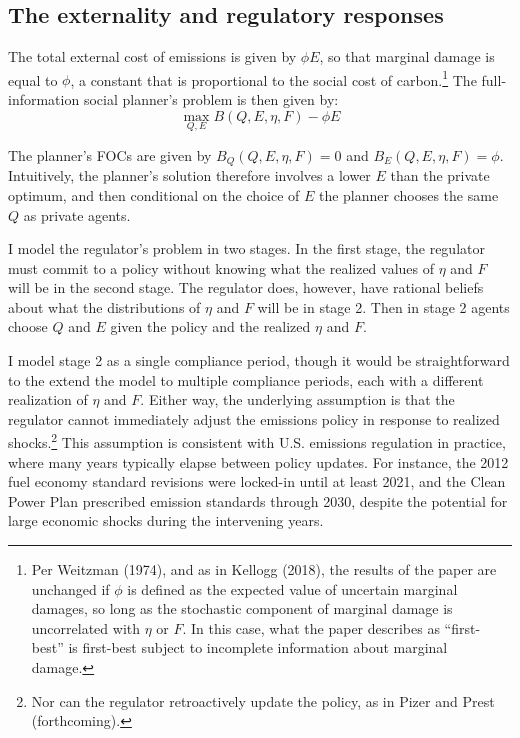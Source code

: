 \documentclass[12pt]{article}
\begin{document}
\subsection{The externality and regulatory responses} \label{sec:externality}

The total external cost of emissions is given by $\phi E$, so that marginal damage is equal to $\phi$, a constant that is proportional to the social cost of carbon.\footnote{Per Weitzman (1974), and as in Kellogg (2018), the results of the paper are unchanged if $\phi$ is defined as the expected value of uncertain marginal damages, so long as the stochastic component of marginal damage is uncorrelated with $\eta$ or $F$. In this case, what the paper describes as ``first-best'' is first-best subject to incomplete information about marginal damage.} The full-information social planner's problem is then given by:
\begin{equation}
\max_{Q,E}B(Q,E,\eta,F)-\phi E \label{eq:SP}
\end{equation}

The planner's FOCs are given by $B_Q(Q,E,\eta,F)=0$ and $B_E(Q,E,\eta,F)=\phi$. Intuitively, the planner's solution therefore involves a lower $E$ than the private optimum, and then conditional on the choice of $E$ the planner chooses the same $Q$ as private agents.

I model the regulator's problem in two stages. In the first stage, the regulator must commit to a policy without knowing what the realized values of $\eta$ and $F$ will be in the second stage. The regulator does, however, have rational beliefs about what the distributions of $\eta$ and $F$ will be in stage 2. Then in stage 2 agents choose $Q$ and $E$ given the policy and the realized $\eta$ and $F$. 

I model stage 2 as a single compliance period, though it would be straightforward to the extend the model to multiple compliance periods, each with a different realization of $\eta$ and $F$. Either way, the underlying assumption is that the regulator cannot immediately adjust the emissions policy in response to realized shocks.\footnote{Nor can the regulator retroactively update the policy, as in Pizer and Prest (forthcoming).} This assumption is consistent with U.S. emissions regulation in practice, where many years typically elapse between policy updates. For instance, the 2012 fuel economy standard revisions were locked-in until at least 2021, and the Clean Power Plan prescribed emission standards through 2030, despite the potential for large economic shocks during the intervening years.
\end{document}
